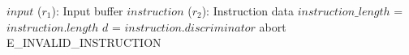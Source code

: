 \begin{algorithm}
\caption{ENTRYPOINT}
\begin{algorithmic}
\INPUT $input$ ($r_1$): Input buffer
\INPUT $instruction$ ($r_2$): Instruction data
  \STATE $instruction\_length$ = $instruction.length$
  \STATE $d$ = $instruction.discriminator$
      \STATE {}
    \ENDIF
  \STATE abort E\_INVALID\_INSTRUCTION
\ENDPROCEDURE
\end{algorithmic}
\end{algorithm}
